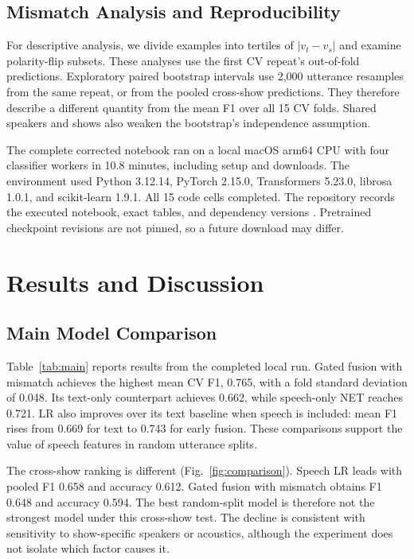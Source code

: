 \documentclass[conference]{IEEEtran}
\begin{document}
\subsection{Mismatch Analysis and Reproducibility}
For descriptive analysis, we divide examples into tertiles of $|v_t-v_s|$ and examine polarity-flip subsets. These analyses use the first CV repeat's out-of-fold predictions. Exploratory paired bootstrap intervals use 2,000 utterance resamples from the same repeat, or from the pooled cross-show predictions. They therefore describe a different quantity from the mean F1 over all 15 CV folds. Shared speakers and shows also weaken the bootstrap's independence assumption.

The complete corrected notebook ran on a local macOS arm64 CPU with four classifier workers in 10.8 minutes, including setup and downloads. The environment used Python 3.12.14, PyTorch 2.15.0, Transformers 5.23.0, librosa 1.0.1, and scikit-learn 1.9.1. All 15 code cells completed. The repository records the executed notebook, exact tables, and dependency versions \cite{truetone}. Pretrained checkpoint revisions are not pinned, so a future download may differ.



\section{Results and Discussion}
\subsection{Main Model Comparison}
Table~\ref{tab:main} reports results from the completed local run. Gated fusion with mismatch achieves the highest mean CV F1, 0.765, with a fold standard deviation of 0.048. Its text-only counterpart achieves 0.662, while speech-only NET reaches 0.721. LR also improves over its text baseline when speech is included: mean F1 rises from 0.669 for text to 0.743 for early fusion. These comparisons support the value of speech features in random utterance splits.

The cross-show ranking is different (Fig.~\ref{fig:comparison}). Speech LR leads with pooled F1 0.658 and accuracy 0.612. Gated fusion with mismatch obtains F1 0.648 and accuracy 0.594. The best random-split model is therefore not the strongest model under this cross-show test. The decline is consistent with sensitivity to show-specific speakers or acoustics, although the experiment does not isolate which factor causes it.
\end{document}
